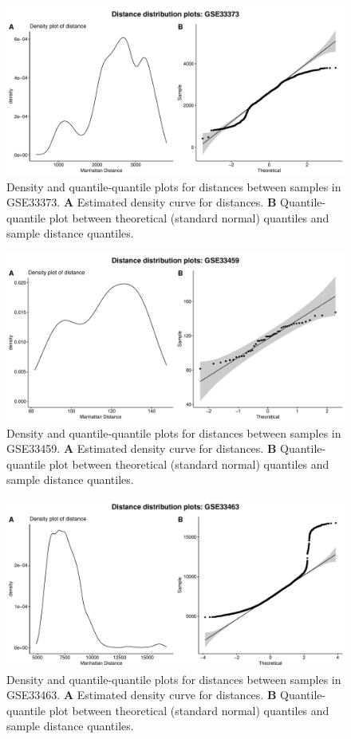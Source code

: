 \documentclass[10pt,letterpaper]{article}\usepackage[]{graphicx}\usepackage[]{color}
\begin{document}
\begin{figure}[H]
	\includegraphics[width=\textwidth]{manhattan-distance_hist_GSE33373.pdf}
	\caption{Density and quantile-quantile plots for distances between samples in GSE33373. \textbf{A} Estimated density curve for distances. \textbf{B} Quantile-quantile plot between theoretical (standard normal) quantiles and sample distance quantiles.}
\end{figure}

\begin{figure}[H]
	\includegraphics[width=\textwidth]{manhattan-distance_hist_GSE33459.pdf}
	\caption{Density and quantile-quantile plots for distances between samples in GSE33459. \textbf{A} Estimated density curve for distances. \textbf{B} Quantile-quantile plot between theoretical (standard normal) quantiles and sample distance quantiles.}
\end{figure}

\begin{figure}[H]
	\includegraphics[width=\textwidth]{manhattan-distance_hist_GSE33463.pdf}
	\caption{Density and quantile-quantile plots for distances between samples in GSE33463. \textbf{A} Estimated density curve for distances. \textbf{B} Quantile-quantile plot between theoretical (standard normal) quantiles and sample distance quantiles.}
\end{figure}
\end{document}
